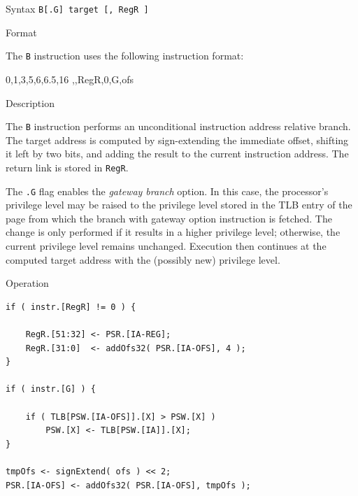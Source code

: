 %
%
\pagebreak
{}

\begin{iPageDescEntry}{Syntax} 
  \texttt{B[.G] target [, RegR ]} \\
\end{iPageDescEntry}

\begin{iPageDescEntry}{Format}

The \texttt{B} instruction uses the following instruction format: \\

\begin{flushleft}
  \drawInstrFormat
  	{0,1,3,5,6,6.5,16}
  	{\OpCodeGrpBR,\OpCodeB,RegR,0,G,ofs}
\end{flushleft}

\end{iPageDescEntry}

\begin{iPageDescEntry}{Description}

The \texttt{B} instruction performs an unconditional instruction address relative branch.  
The target address is computed by sign-extending the immediate offset, shifting it left by two bits, and adding the result to the current instruction address. The return link is stored in \texttt{RegR}. 

The \texttt{.G} flag enables the \emph{gateway branch} option. In this case, the processor’s privilege level may be raised to the privilege level stored in the TLB entry of the page from which the branch with gateway option instruction is fetched. The change is only performed if it results in a higher privilege level; otherwise, the current privilege level remains unchanged. Execution then continues at the computed target address with the (possibly new) privilege level.  

\end{iPageDescEntry}

\begin{iPageDescOpEntry}{Operation}
\begin{lstlisting}[style=iPageOpStyle]
if ( instr.[RegR] != 0 ) {
	
	RegR.[51:32] <- PSR.[IA-REG];
	RegR.[31:0]  <- addOfs32( PSR.[IA-OFS], 4 );
}

if ( instr.[G] ) {
    
    if ( TLB[PSW.[IA-OFS]].[X] > PSW.[X] ) 
        PSW.[X] <- TLB[PSW.[IA]].[X];
}

tmpOfs <- signExtend( ofs ) << 2;
PSR.[IA-OFS] <- addOfs32( PSR.[IA-OFS], tmpOfs );
\end{lstlisting}
\end{iPageDescOpEntry}

